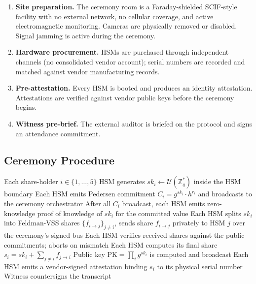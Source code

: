 \begin{enumerate}[nosep]
\item \textbf{Site preparation.} The ceremony room is a Faraday-shielded
SCIF-style facility with no external network, no cellular coverage,
and active electromagnetic monitoring. Cameras are physically removed
or disabled. Signal jamming is active during the ceremony.
\item \textbf{Hardware procurement.} HSMs are purchased through
independent channels (no consolidated vendor account); serial numbers
are recorded and matched against vendor manufacturing records.
\item \textbf{Pre-attestation.} Every HSM is booted and produces an
identity attestation. Attestations are verified against vendor
public keys before the ceremony begins.
\item \textbf{Witness pre-brief.} The external auditor is briefed on
the protocol and signs an attendance commitment.
\end{enumerate}

\subsection{Ceremony Procedure}

\begin{algorithm}
\caption{Cold-tier key generation (CGGMP21 over secp256k1)}
\begin{algorithmic}[1]
\State Each share-holder $i \in \{1,\ldots,5\}$ HSM generates
       $sk_i \gets \mathcal{U}(\mathbb{Z}_q^*)$ inside the HSM boundary
\State Each HSM emits Pedersen commitment
       $C_i = g^{sk_i} \cdot h^{r_i}$ and broadcasts to the
       ceremony orchestrator
\State After all $C_i$ broadcast, each HSM emits zero-knowledge
       proof of knowledge of $sk_i$ for the committed value
\State Each HSM splits $sk_i$ into Feldman-VSS shares
       $\{f_{i \to j}\}_{j \neq i}$, sends share $f_{i \to j}$
       privately to HSM $j$ over the ceremony's signed bus
\State Each HSM verifies received shares against the public
       commitments; aborts on mismatch
\State Each HSM computes its final share
       $s_i = sk_i + \sum_{j \neq i} f_{j \to i}$
\State Public key $\mathrm{PK} = \prod_i g^{sk_i}$ is computed and
       broadcast
\State Each HSM emits a vendor-signed attestation binding $s_i$
       to its physical serial number
\State Witness countersigns the transcript
\end{algorithmic}
\end{algorithm}

